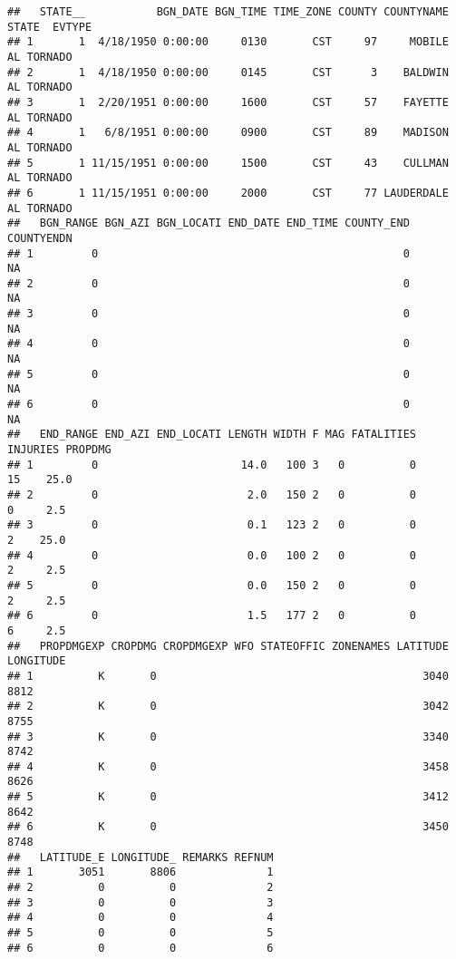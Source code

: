 \documentclass[]{article}
\begin{document}
\begin{verbatim}
##   STATE__           BGN_DATE BGN_TIME TIME_ZONE COUNTY COUNTYNAME STATE  EVTYPE
## 1       1  4/18/1950 0:00:00     0130       CST     97     MOBILE    AL TORNADO
## 2       1  4/18/1950 0:00:00     0145       CST      3    BALDWIN    AL TORNADO
## 3       1  2/20/1951 0:00:00     1600       CST     57    FAYETTE    AL TORNADO
## 4       1   6/8/1951 0:00:00     0900       CST     89    MADISON    AL TORNADO
## 5       1 11/15/1951 0:00:00     1500       CST     43    CULLMAN    AL TORNADO
## 6       1 11/15/1951 0:00:00     2000       CST     77 LAUDERDALE    AL TORNADO
##   BGN_RANGE BGN_AZI BGN_LOCATI END_DATE END_TIME COUNTY_END COUNTYENDN
## 1         0                                               0         NA
## 2         0                                               0         NA
## 3         0                                               0         NA
## 4         0                                               0         NA
## 5         0                                               0         NA
## 6         0                                               0         NA
##   END_RANGE END_AZI END_LOCATI LENGTH WIDTH F MAG FATALITIES INJURIES PROPDMG
## 1         0                      14.0   100 3   0          0       15    25.0
## 2         0                       2.0   150 2   0          0        0     2.5
## 3         0                       0.1   123 2   0          0        2    25.0
## 4         0                       0.0   100 2   0          0        2     2.5
## 5         0                       0.0   150 2   0          0        2     2.5
## 6         0                       1.5   177 2   0          0        6     2.5
##   PROPDMGEXP CROPDMG CROPDMGEXP WFO STATEOFFIC ZONENAMES LATITUDE LONGITUDE
## 1          K       0                                         3040      8812
## 2          K       0                                         3042      8755
## 3          K       0                                         3340      8742
## 4          K       0                                         3458      8626
## 5          K       0                                         3412      8642
## 6          K       0                                         3450      8748
##   LATITUDE_E LONGITUDE_ REMARKS REFNUM
## 1       3051       8806              1
## 2          0          0              2
## 3          0          0              3
## 4          0          0              4
## 5          0          0              5
## 6          0          0              6
\end{verbatim}
\end{document}
